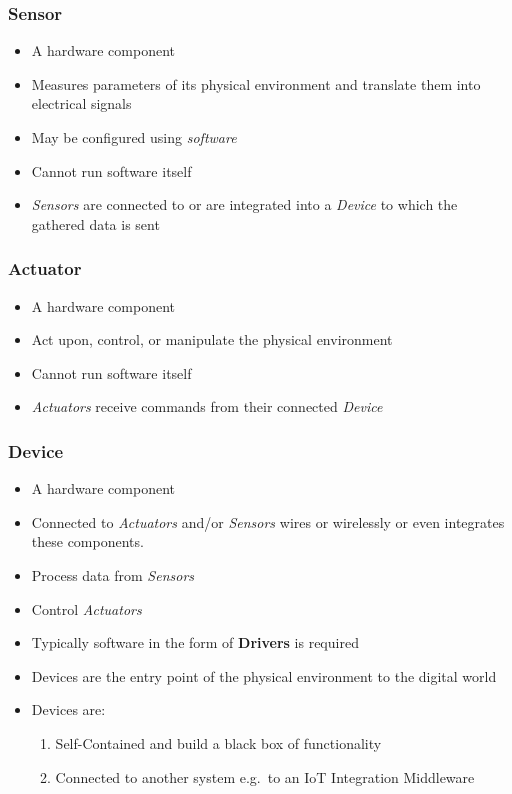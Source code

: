 \documentclass{../iot-lecture}
\begin{document}
\begin{frame}
  \frametitle{Sensor}
  \begin{itemize}
    \item A hardware component
    \item Measures parameters of its physical environment and translate them into electrical signals
    \item May be configured using \textit{software}
    \item Cannot run software itself
    \item \textit{\color{YellowOrange} Sensors} are connected to or are integrated into a \textit{\color{LimeGreen} Device} to which the gathered data is sent
  \end{itemize}
\end{frame}

\begin{frame}
  \frametitle{Actuator}
  \begin{itemize}
    \item A hardware component
    \item Act upon, control, or manipulate the physical environment
    \item Cannot run software itself
    \item \textit{\color{RubineRed} Actuators} receive commands from their connected \textit{\color{LimeGreen} Device}
  \end{itemize}
\end{frame}

\begin{frame}
  \frametitle{Device}
  \begin{itemize}
    \item A hardware component
    \item Connected to \textit{\color{RubineRed} Actuators} and/or \textit{\color{YellowOrange} Sensors} wires or wirelessly or even integrates these components.
    \item Process data from \textit{\color{YellowOrange} Sensors}
    \item Control \textit{\color{RubineRed} Actuators}
    \item Typically software in the form of \textbf{\color{Purple} Drivers} is required
    \item Devices are the entry point of the physical environment to the digital world
    \item Devices are:
    \begin{enumerate}
      \item Self-Contained and build a black box of functionality
      \item Connected to another system e.g.\ to an IoT Integration Middleware
    \end{enumerate}
  \end{itemize}
\end{frame}
\end{document}

